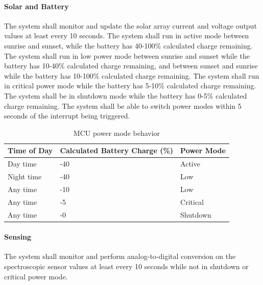 \paragraph{Solar and Battery} The system shall monitor and update the solar array current and voltage output values at least every 10 seconds. The system shall run in active mode between sunrise and sunset, while the battery has 40-100\% calculated charge remaining. The system shall run in low power mode between sunrise and sunset while the battery has 10-40\% calculated charge remaining, and between sunset and sunrise while the battery has 10-100\% calculated charge remaining. The system shall run in critical power mode while the battery has 5-10\% calculated charge remaining. The system shall be in shutdown mode while the battery has 0-5\% calculated charge remaining. The system shall be able to switch power modes within 5 seconds of the interrupt being triggered.
\begin{table}
	\centering
	\begin{tabularx}{\textwidth}
		{
			| >{\raggedright\arraybackslash}X
			| >{\raggedright\arraybackslash}X
			| >{\raggedright\arraybackslash}X
			|
		}
		\caption{MCU power mode behavior}
		\label{table:mcu_battery} \\
		\hline
		\textbf{Time of Day} & \textbf{Calculated Battery Charge (\%)} & \textbf{Power Mode} \\
		\hline
        Day time & 100-40 & Active \\
        \hline
        Night time & 100-40 & Low \\
        \hline
        Any time & 40-10 & Low \\
        \hline
        Any time & 10-5 & Critical \\
        \hline
        Any time & 5-0 & Shutdown \\
        \hline
	\end{tabularx}
\end{table}

\paragraph{Sensing} The system shall monitor and perform analog-to-digital conversion on the spectroscopic sensor values at least every 10 seconds while not in shutdown or critical power mode.

